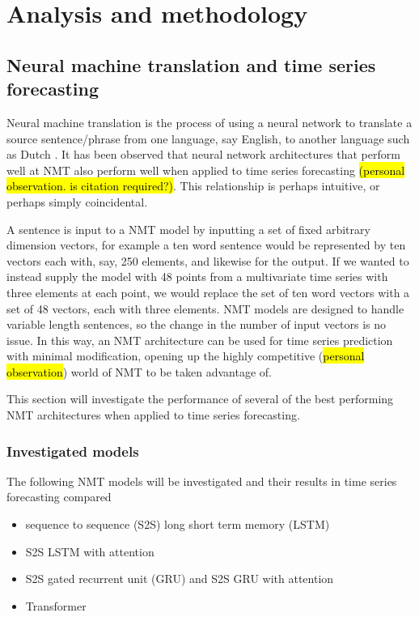 \chapter{Analysis and methodology}

\section{Neural machine translation and time series forecasting}
Neural machine translation is the process of using a neural network to translate a source sentence/phrase from one language, say English, to another language such as Dutch \citep{Cho2014}.
It has been observed that neural network architectures that perform well at NMT also perform well when applied to time series forecasting \hl{(personal observation. is citation required?)}.
This relationship is perhaps intuitive, or perhaps simply coincidental.
\par
A sentence is input to a NMT model by inputting a set of fixed arbitrary dimension vectors, for example a ten word sentence would be represented by ten vectors each with, say, 250 elements, and likewise for the output.
If we wanted to instead supply the model with 48 points from a multivariate time series with three elements at each point, we would replace the set of ten word vectors with a set of 48 vectors, each with three elements.
NMT models are designed to handle variable length sentences, so the change in the number of input vectors is no issue.
In this way, an NMT architecture can be used for time series prediction with minimal modification, opening up the highly competitive (\hl{personal observation}) world of NMT to be taken advantage of.
\par
This section will investigate the performance of several of the best performing NMT architectures when applied to time series forecasting.

\subsection{Investigated models}
The following NMT models will be investigated and their results in time series forecasting compared
\begin{itemize}
	\item sequence to sequence (S2S) \citep{Cho2014a} long short term memory (LSTM) \citep{hochreiter1997long}
	\item S2S LSTM with attention \citep{luong2015effective}
	\item S2S gated recurrent unit (GRU) \citep{Cho2014a} and S2S GRU with attention
	\item Transformer \citep{Vaswani2017}
\end{itemize}

